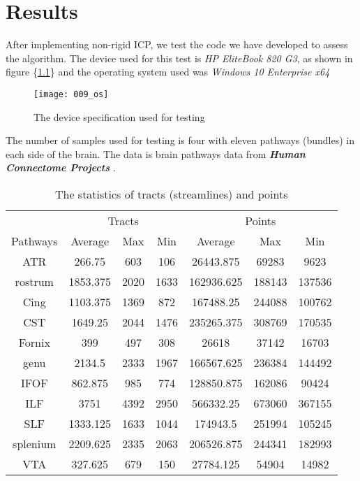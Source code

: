 \documentclass[../structure.tex]{subfiles}
\begin{document}
\chapter{Results}
\hspace{2em}After implementing non-rigid ICP, we test the code we have developed to assess the algorithm. The device used for this test is \textit{HP EliteBook 820 G3}, as shown in figure \{\ref{fig:OS}\} and the operating system used was \textit{Windows 10 Enterprise x64}

\begin{figure}[h!]
\centering
\texttt{[image: 009\_os]}
\captionsetup{justification=centering}
\caption{The device specification used for testing}
\label{fig:OS}
\end{figure}

The number of samples used for testing is four with eleven pathways (bundles) in each side of the brain. The data is brain pathways data from \textbf{\textit{Human Connectome Projects}} \cite{CCF}.
\begin{center}
\begin{table}[h!]
	\begin{tabular}{| c | c  c  c | c  c  c |}
	\toprule
	&\multicolumn{3}{c}{Tracts}&\multicolumn{3}{c}{Points}\\
Pathways&Average&Max&Min&Average&Max&Min\\
\midrule
ATR&266.75&603&106&26443.875&69283&9623\\
rostrum&1853.375&2020&1633&162936.625&188143&137536\\
Cing&1103.375&1369&872&167488.25&244088&100762\\
CST&1649.25&2044&1476&235265.375&308769&170535\\
Fornix&399&497&308&26618&37142&16703\\
genu&2134.5&2333&1967&166567.625&236384&144492\\
IFOF&862.875&985&774&128850.875&162086&90424\\
ILF&3751&4392&2950&566332.25&673060&367155\\
SLF&1333.125&1633&1044&174943.5&251994&105245\\
splenium&2209.625&2335&2063&206526.875&244341&182993\\
VTA&327.625&679&150&27784.125&54904&14982\\
\bottomrule
	\end{tabular}
\caption{The statistics of tracts (streamlines) and points}
\label{table:data}
\end{table}
\end{center}
\end{document}
